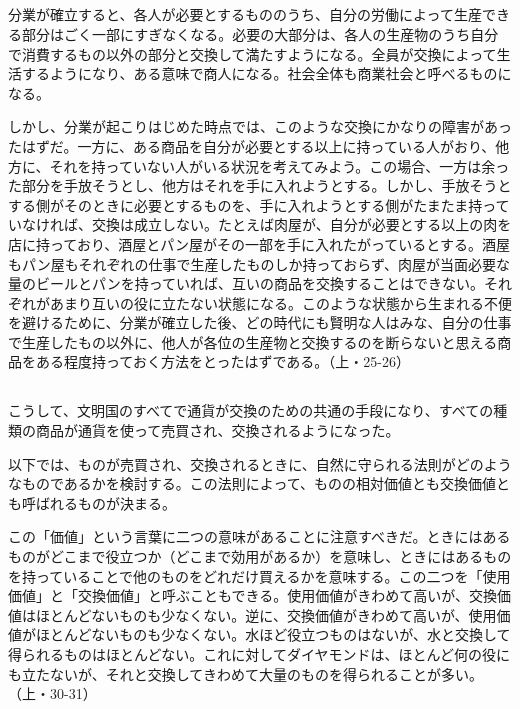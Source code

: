 \subsection{}


分業が確立すると、各人が必要とするもののうち、自分の労働によって生産できる部分はごく一部にすぎなくなる。必要の大部分は、各人の生産物のうち自分で消費するもの以外の部分と交換して満たすようになる。全員が交換によって生活するようになり、ある意味で商人になる。社会全体も商業社会と呼べるものになる。

しかし、分業が起こりはじめた時点では、このような交換にかなりの障害があったはずだ。一方に、ある商品を自分が必要とする以上に持っている人がおり、他方に、それを持っていない人がいる状況を考えてみよう。この場合、一方は余った部分を手放そうとし、他方はそれを手に入れようとする。しかし、手放そうとする側がそのときに必要とするものを、手に入れようとする側がたまたま持っていなければ、交換は成立しない。たとえば肉屋が、自分が必要とする以上の肉を店に持っており、酒屋とパン屋がその一部を手に入れたがっているとする。酒屋もパン屋もそれぞれの仕事で生産したものしか持っておらず、肉屋が当面必要な量のビールとパンを持っていれば、互いの商品を交換することはできない。それぞれがあまり互いの役に立たない状態になる。このような状態から生まれる不便を避けるために、分業が確立した後、どの時代にも賢明な人はみな、自分の仕事で生産したもの以外に、他人が各位の生産物と交換するのを断らないと思える商品をある程度持っておく方法をとったはずである。（上・25-26）

\subsection{}



こうして、文明国のすべてで通貨が交換のための共通の手段になり、すべての種類の商品が通貨を使って売買され、交換されるようになった。

以下では、ものが売買され、交換されるときに、自然に守られる法則がどのようなものであるかを検討する。この法則によって、ものの相対価値とも交換価値とも呼ばれるものが決まる。

この「価値」という言葉に二つの意味があることに注意すべきだ。ときにはあるものがどこまで役立つか（どこまで効用があるか）を意味し、ときにはあるものを持っていることで他のものをどれだけ買えるかを意味する。この二つを「使用価値」と「交換価値」と呼ぶこともできる。使用価値がきわめて高いが、交換価値はほとんどないものも少なくない。逆に、交換価値がきわめて高いが、使用価値がほとんどないものも少なくない。水ほど役立つものはないが、水と交換して得られるものはほとんどない。これに対してダイヤモンドは、ほとんど何の役にも立たないが、それと交換してきわめて大量のものを得られることが多い。（上・30-31）

